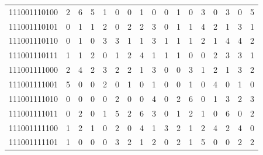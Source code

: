 \documentclass[10pt,a4paper]{article}
\begin{document}
\begin{longtable}{ |c|c|c|c|c|c|c|c|c|c|c|c|c|c|c|c|c| }
    111001110100              & 2                            & 6                                & 5                            & 1                              & 0   & 0   & 1   & 0   & 0   & 1   & 0   & 3   & 0   & 3   & 0   & 5   \\
    111001110101              & 0                            & 1                                & 1                            & 2                              & 0   & 2   & 2   & 3   & 0   & 1   & 1   & 4   & 2   & 1   & 3   & 1   \\
    111001110110              & 0                            & 1                                & 0                            & 3                              & 3   & 1   & 1   & 3   & 1   & 1   & 1   & 2   & 1   & 4   & 4   & 2   \\
    111001110111              & 1                            & 1                                & 2                            & 0                              & 1   & 2   & 4   & 1   & 1   & 1   & 0   & 0   & 2   & 3   & 3   & 1   \\
    111001111000              & 2                            & 4                                & 2                            & 3                              & 2   & 2   & 1   & 3   & 0   & 0   & 3   & 1   & 2   & 1   & 3   & 2   \\
    111001111001              & 5                            & 0                                & 0                            & 2                              & 0   & 1   & 0   & 1   & 0   & 0   & 1   & 0   & 4   & 0   & 1   & 0   \\
    111001111010              & 0                            & 0                                & 0                            & 0                              & 2   & 0   & 0   & 4   & 0   & 2   & 6   & 0   & 1   & 3   & 2   & 3   \\
    111001111011              & 0                            & 2                                & 0                            & 1                              & 5   & 2   & 6   & 3   & 0   & 1   & 2   & 1   & 0   & 6   & 0   & 2   \\
    111001111100              & 1                            & 2                                & 1                            & 0                              & 2   & 0   & 4   & 1   & 3   & 2   & 1   & 2   & 4   & 2   & 4   & 0   \\
    111001111101              & 1                            & 0                                & 0                            & 0                              & 3   & 2   & 1   & 2   & 0   & 2   & 1   & 5   & 0   & 0   & 2   & 2   \\

\end{longtable}
\end{document}
